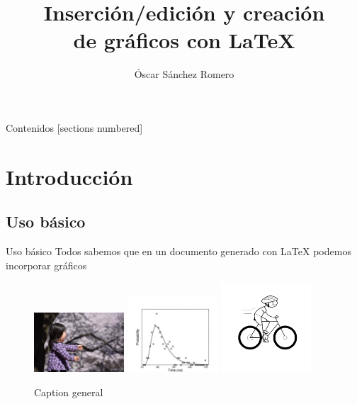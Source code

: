 \documentclass[10pt]{beamer}
\title{Inserción/edición y creación \\ de 
gráficos con \LaTeX{}}
\date{}
\author{Óscar Sánchez Romero}
\institute{Dpto. Matemática Aplicada, UGR}
\begin{document}
\maketitle

\begin{frame}{Contenidos}
  [sections numbered]
  \tableofcontents[hideallsubsections]
\end{frame}

\section{Introducción}

\subsection{Uso básico}
\begin{frame}[fragile]{Uso básico}
Todos sabemos que en un documento generado con \LaTeX{} podemos incorporar  gráficos  
\begin{figure}[h]
\includegraphics[width=0.3\textwidth]{graficos/sorpresa.jpg} 
\includegraphics[width=0.3\textwidth]{graficos/fig_9Vis.pdf}
\includegraphics[width=0.3\textwidth]{graficos/ciclista.png}
\caption{Caption general}
\label{figGeneral}
\end{figure}
\end{frame}
\end{document}
